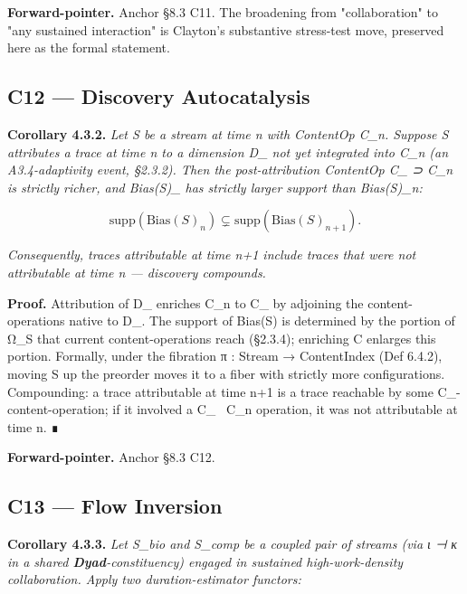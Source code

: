 \documentclass[11pt, openany]{book}
\begin{document}
\textbf{Forward-pointer.} Anchor §8.3 C11. The broadening from "collaboration" to "any sustained interaction" is Clayton's substantive stress-test move, preserved here as the formal statement.

\subsection{C12 --- Discovery Autocatalysis}

\textbf{Corollary 4.3.2.} \textit{Let S be a stream at time n with ContentOp C\_\allowbreak{}n. Suppose S attributes a trace at time n to a dimension D\_ not yet integrated into C\_\allowbreak{}n (an A3.4-adaptivity event, §2.3.2). Then the post-attribution ContentOp C\_ ⊃ C\_\allowbreak{}n is strictly richer, and Bias(S)\_ has strictly larger support than Bias(S)\_\allowbreak{}n:}

\[
\mathrm{supp}(\mathrm{Bias}(S)_n) \subsetneq \mathrm{supp}(\mathrm{Bias}(S)_{n+1}).
\]

\textit{Consequently, traces attributable at time n+1 include traces that were not attributable at time n --- discovery compounds.}

\textbf{Proof.} Attribution of D\_ enriches C\_\allowbreak{}n to C\_ by adjoining the content-operations native to D\_. The support of Bias(S) is determined by the portion of Ω\_\allowbreak{}S that current content-operations reach (§2.3.4); enriching C enlarges this portion. Formally, under the fibration π : Stream → ContentIndex (Def 6.4.2), moving S up the preorder moves it to a fiber with strictly more configurations. Compounding: a trace attributable at time n+1 is a trace reachable by some C\_-content-operation; if it involved a C\_ \ C\_\allowbreak{}n operation, it was not attributable at time n. ∎

\textbf{Forward-pointer.} Anchor §8.3 C12.

\subsection{C13 --- Flow Inversion}

\textbf{Corollary 4.3.3.} \textit{Let S\_\allowbreak{}bio and S\_\allowbreak{}comp be a coupled pair of streams (via ι ⊣ κ in a shared \textbf{Dyad}-constituency) engaged in sustained high-work-density collaboration. Apply two duration-estimator functors:}
\end{document}
